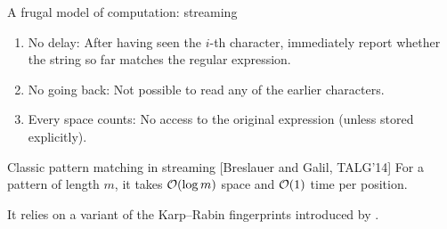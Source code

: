 \documentclass[aspectratio=169,10pt]{beamer}
\begin{document}
\begin{frame}{A frugal model of computation: streaming}
\smallskip
\pause
\begin{enumerate}
\item No delay: After having seen the $i$-th character, immediately report whether the string so far matches the regular expression.
\pause
\item No going back: Not possible to read any of the earlier characters.
\pause
\item Every space counts: No access to the original expression (unless stored explicitly).
\end{enumerate}
\pause
\begin{mylemblock}{Classic pattern matching in streaming [Breslauer and Galil, TALG'14]}
    For a pattern of length $m$, it takes $\mathcal{O}(\log m)$ space and $\mathcal{O}(1)$ time per position.
\end{mylemblock}\pause
\begin{center}
    \small
    It relies on a variant of the Karp--Rabin fingerprints introduced by .
\end{center}
\end{frame}
\end{document}
